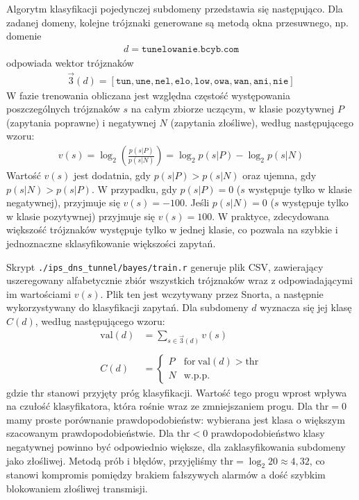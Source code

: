 \documentclass{eiti-raport}
\begin{document}
Algorytm klasyfikacji pojedynczej subdomeny przedstawia się następująco. Dla zadanej domeny, kolejne trójznaki generowane są metodą okna przesuwnego, np. domenie
\begin{align*}
d = \texttt{tunelowanie.bcyb.com}
\end{align*}
odpowiada wektor trójznaków 
\begin{align*}
\vec{3}(d) = \left[ \texttt{tun}, \texttt{une}, \texttt{nel}, \texttt{elo}, \texttt{low}, \texttt{owa}, \texttt{wan}, \texttt{ani}, \texttt{nie} \right]
\end{align*}
W fazie trenowania obliczana jest względna częstość występowania poszczególnych trójznaków $s$ na całym zbiorze uczącym, w klasie pozytywnej $P$ (zapytania poprawne) i negatywnej $N$ (zapytania złośliwe), według następującego wzoru:
\begin{align*}
v(s) = \log_2 \left( \frac{p\left(s|P\right)}{p\left(s|N\right)} \right) = \log_2 p\left(s|P\right) - \log_2 p\left(s|N\right) 
\end{align*}
Wartość $v(s)$ jest dodatnia, gdy $p(s|P) > p(s|N)$ oraz ujemna, gdy $p(s|N) > p(s|P)$. W przypadku, gdy $p(s|P) = 0$ ($s$ występuje tylko w klasie negatywnej), przyjmuje się $v(s) = -100$. Jeśli $p(s|N) = 0$ ($s$ występuje tylko w klasie pozytywnej) przyjmuje się $v(s) = 100$. W praktyce, zdecydowana większość trójznaków występuje tylko w jednej klasie, co pozwala na szybkie i jednoznaczne sklasyfikowanie większości zapytań. 

Skrypt \texttt{./ips\_dns\_tunnel/bayes/train.r} generuje plik CSV, zawierający uszeregowany alfabetycznie zbiór wszystkich trójznaków wraz z odpowiadającymi im wartościami $v(s)$. Plik ten jest wczytywany przez Snorta, a następnie wykorzystywany do klasyfikacji zapytań. Dla subdomeny $d$ wyznacza się jej klasę $C(d)$, według następującego wzoru:
\begin{align*}
\text{val}(d) & = \sum_{s \in \vec{3}(d)} v(s) \\ \\ 
C(d) & = \begin{cases}
	P & \text{for} \ \text{val}(d) > \textrm{thr} \\ 
	N & \text{w.p.p.}
\end{cases}
\end{align*}
gdzie $\textrm{thr}$ stanowi przyjęty próg klasyfikacji. Wartość tego progu wprost wpływa na czułość klasyfikatora, która rośnie wraz ze zmniejszaniem progu. Dla $\text{thr} = 0$ mamy proste porównanie prawdopodobieństw: wybierana jest klasa o większym szacowanym prawdopodobieństwie. Dla $\text{thr} < 0$ prawdopodobieństwo klasy negatywnej powinno być odpowiednio większe, dla zaklasyfikowania subdomeny jako złośliwej. Metodą prób i błędów, przyjęliśmy $\text{thr} = \log_2 20 \approx 4,32$, co stanowi kompromis pomiędzy brakiem fałszywych alarmów a dość szybkim blokowaniem złośliwej transmisji. 
\end{document}
